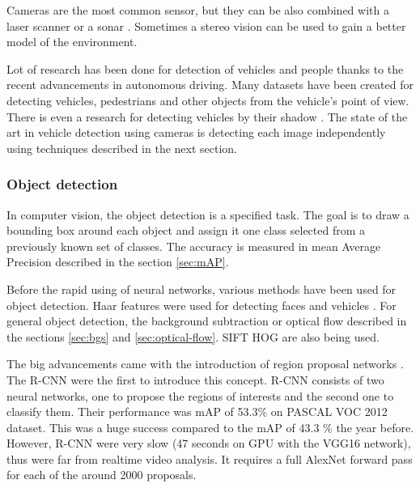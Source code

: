 \documentclass[a4paper,12pt,titlepage, twoside]{article}
\numberwithin{figure}{section}
\begin{document}
Cameras are the most common sensor, but they can be also combined with a laser scanner \cite{wender20083d, premebida2007lidar} or a sonar \cite{kim2005front, wang2003online}. Sometimes a stereo vision \cite{bertozzi2000stereo, toulminet2006vehicle} can be used to gain a better model of the environment.

Lot of research has been done for detection of vehicles and people thanks to the recent advancements in autonomous driving. Many datasets have been created \cite{apollo-scape, madhavan2017bdd, RobotCarDatasetIJRR, ncarlevaris-2015a} for detecting vehicles, pedestrians and other objects from the vehicle's point of view. There is even a research for detecting vehicles by their shadow \cite{tzomakas1998vehicle}. The state of the art in vehicle detection using cameras is detecting each image independently using techniques described in the next section.


\subsubsection{Object detection}

In computer vision, the object detection is a specified task. The goal is to draw a bounding box around each object and assign it one class selected from a previously known set of classes. The accuracy is measured in mean Average Precision described in the section \ref{sec:mAP}. 

Before the rapid using of neural networks, various methods have been used for object detection. Haar features were used for detecting faces \cite{haar, lienhart2002extended, viola2004robust} and vehicles \cite{sun2002real}. For general object detection, the background subtraction \cite{piccardi2004background, horprasert1999statistical} or optical flow \cite{naoya1990optical, quenot1992orthogonal, chen2011tracking} described in the sections \ref{sec:bgs} and \ref{sec:optical-flow}. SIFT \cite{lowe2004distinctive} HOG \cite{girshick2014rich, wang2009hog, zhu2006fast, felzenszwalb2010object, dalal2005histograms} are also being used.

The big advancements came with the introduction of region proposal networks \cite{girshick2016region}. The R-CNN \cite{DBLP:journals/corr/GirshickDDM13} were the first to introduce this concept. R-CNN consists of two neural networks, one to propose the regions of interests and the second one to classify them. Their performance was mAP of 53.3\% on PASCAL VOC 2012 dataset. This was a huge success compared to the mAP of 43.3 \%\cite{carreira2012cpmc} the year before. However, R-CNN were very slow (47 seconds on GPU with the VGG16 \cite{simonyan2014very} network), thus were far from realtime video analysis. It requires a full AlexNet forward pass for each of the around 2000 proposals.
\end{document}
